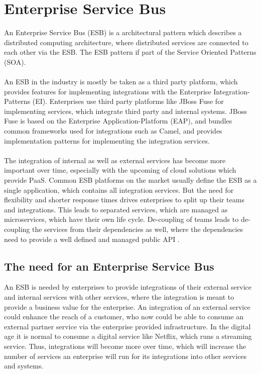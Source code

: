 \chapter{Enterprise Service Bus}
\label{cha:esb}
An Enterprise Service Bus (ESB) is a architectural pattern which describes a distributed computing architecture, where distributed services are connected to each other via the ESB. The ESB pattern if part of the Service Oriented Patterns (SOA).   
\\ \\
An ESB in the industry is mostly be taken as a third party platform, which provides features for implementing integrations with the Enterprise Integration-Patterns (EI). Enterprises use third party platforms like JBoss Fuse for implementing services, which integrate third party and internal systems. JBoss Fuse is based on the Enterprise Application-Platform (EAP), and bundles common frameworks used for integrations such as Camel, and provides implementation patterns for implementing the integration services.
\\ \\
The integration of internal as well as external services has become more important over time, especially with the upcoming of cloud solutions which provide PaaS. Common ESB platforms on the market usually define the ESB as a single application, which contains all integration services. But the need for flexibility and shorter response times drives enterprises to split up their teams and integrations. This leads to separated services, which are managed as microservices, which have their own life cycle. De-coupling of teams leads to de-coupling the services from their dependencies as well, where the dependencies need to provide a well defined and managed public API \cite{Camel2015, RedHatAgileIntegration2017, EIP}.

\section{The need for an Enterprise Service Bus}
\label{sec:esb-need-for-esb}
An ESB is needed by enterprises to provide integrations of their external service and internal services with other services, where the integration is meant to provide a business value for the enterprise. An integration of an external service could enhance the reach of a customer, who now could be able to consume an external partner service via the enterprise provided infrastructure. In the digital age it is normal to consume a digital service like Netflix, which runs a streaming service. Thus, integrations will become more over time, which will increase the number of services an enterprise will run for its integrations into other services and systems.

